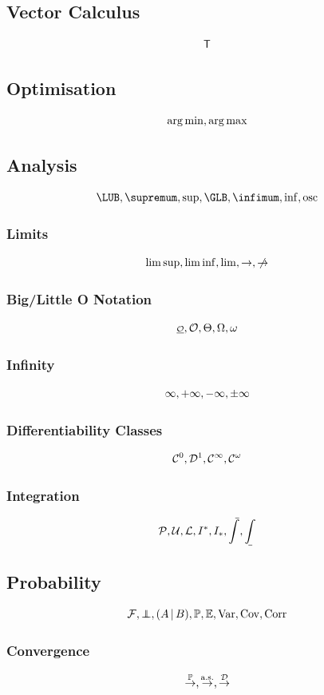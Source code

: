 \documentclass{article}
\begin{document}
\subsection{Vector Calculus}
\[
    \mathsf{T}
\]

\subsection{Optimisation}
\[
    \operatorname*{arg\,min}, \operatorname*{arg\,max}
\]

\subsection{Analysis}
\[
    \LUB, \supremum, \sup, \GLB, \infimum, \inf, \osc
\]

\subsubsection{Limits}
\[
    \limsup, \liminf, \lim, \to, \notto
\]

\subsubsection{Big/Little O Notation}
\[
    \littleO, \bigO, \bigTheta, \bigOmega, \littleOmega
\]

\subsubsection{Infinity}
\[
    \infty, +\infty, -\infty, \pm\infty
\]

\subsubsection{Differentiability Classes}
\[
    \mathcal{C}^{0}, \mathcal{D}^{1}, \mathcal{C}^{\infty}, \mathcal{C}^{\omega}
\]

\subsubsection{Integration}
\[
    \partition, \upperSum, \lowerSum, \upperI, \lowerI, \upperInt, \lowerInt
\]

\subsection{Probability}
\[
    \eventSpace, \indp, \pqty{\Conditional{A}{B}}, \Prob, \Expt, \Var, \Cov, \Corr
\]

\subsubsection{Convergence}
\[
    \overset{\mathbb{P}}{\to}, \overset{\text{a.s.}}{\to}, \overset{\mathcal{D}}{\to}
\]
\end{document}
